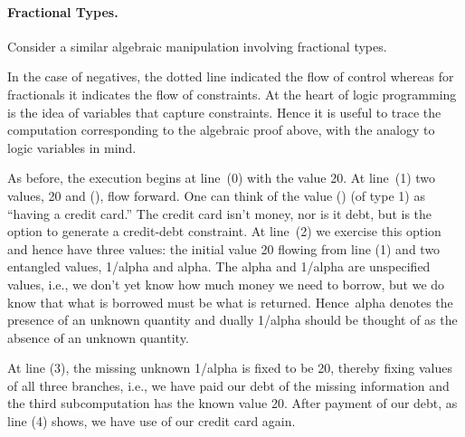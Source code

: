 \documentclass[preprint]{sigplanconf}
\begin{document}
\paragraph*{Fractional Types.} 
Consider a similar algebraic manipulation involving fractional types.
\begin{center}
\end{center}
In the case of negatives, the dotted line indicated the flow of control
whereas for fractionals it indicates the flow of constraints. At the heart of
logic programming is the idea of variables that capture constraints. Hence it
is useful to trace the computation corresponding to the algebraic proof
above, with the analogy to logic variables in mind.

As before, the execution begins at line~(0) with the value {{20}}. At
line~(1) two values, {{20}} and {{()}}, flow forward. One can think of the
value {{()}} (of type {{1}}) as ``having a credit card.'' The credit card
isn't money, nor is it debt, but is the option to generate a credit-debt
constraint.  At line~(2) we exercise this option and hence have three values:
the initial value {{20}} flowing from line (1) and two entangled values,
{{1/alpha}} and {{alpha}}. The {{alpha}} and {{1/alpha}} are unspecified
values, i.e., we don't yet know how much money we need to borrow, but we do
know that what is borrowed must be what is returned. Hence~{{alpha}} denotes
the presence of an unknown quantity and dually {{1/alpha}} should be thought
of as the absence of an unknown quantity.


At line (3), the missing unknown {{1/alpha}} is fixed to be {{20}}, thereby
fixing values of all three branches, i.e., we have paid our debt of the missing
information and the third subcomputation has the known value {{20}}. After
payment of our debt, as line (4) shows, we have use of our credit card again.
\end{document}
